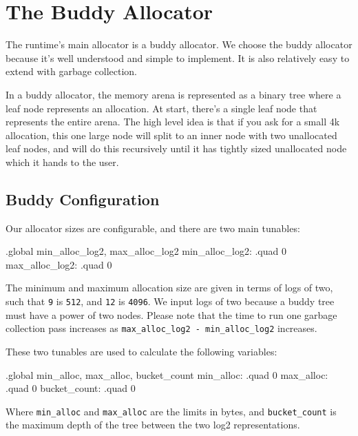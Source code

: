 






\section{The Buddy Allocator}

The runtime's main allocator is a buddy allocator. We choose the buddy
allocator because it's well understood and simple to implement. It is also
relatively easy to extend with garbage collection.

In a buddy allocator, the memory arena is represented as a binary tree where a
leaf node represents an allocation. At start, there's a single leaf node that
represents the entire arena. The high level idea is that if you ask for a small
4k allocation, this one large node will split to an inner node with two
unallocated leaf nodes, and will do this recursively until it has tightly sized
unallocated node which it hands to the user.

\subsection{Buddy Configuration}

Our allocator sizes are configurable, and there are two main tunables:

\begin{asmdata}
.global	min_alloc_log2, max_alloc_log2
min_alloc_log2: .quad 0
max_alloc_log2: .quad 0
\end{asmdata}

The minimum and maximum allocation size are given in terms of logs of two, such
that \lstinline|9| is \lstinline|512|, and \lstinline|12|
is \lstinline|4096|. We input logs of two because a buddy tree must have a
power of two nodes. Please note that the time to run one garbage collection
pass increases as \lstinline|max_alloc_log2 - min_alloc_log2| increases.

These two tunables are used to calculate the following variables:

\begin{asmdata}
.global min_alloc, max_alloc, bucket_count
min_alloc: .quad 0
max_alloc: .quad 0
bucket_count: .quad 0
\end{asmdata}

Where \lstinline|min_alloc| and \lstinline|max_alloc| are the limits in bytes,
and \lstinline|bucket_count| is the maximum depth of the tree between the two
log2 representations.

